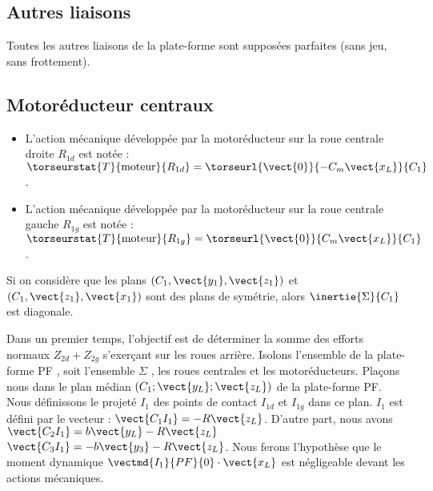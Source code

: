 \subsection*{Autres liaisons}
Toutes les autres liaisons de la plate-forme sont supposées parfaites (sans jeu, sans frottement).

\subsection*{Motoréducteur centraux}
\begin{itemize}
\item L'action mécanique développée par la motoréducteur sur la roue centrale droite $R_{1d}$ est notée : 
$\torseurstat{T}{\text{moteur}}{R_{1d}} = \torseurl{\vect{0}}{-C_m\vect{x_L}}{C_1}$.
\item L'action mécanique développée par la motoréducteur sur la roue centrale gauche $R_{1g}$ est notée : 
$\torseurstat{T}{\text{moteur}}{R_{1g}} = \torseurl{\vect{0}}{C_m\vect{x_L}}{C_1}$.
\end{itemize}

\ifprof
\begin{corrige}
Si on considère que les plans  $\left(C_1,\vect{y_1},\vect{z_1}\right)$ et 
$\left(C_1,\vect{z_1},\vect{x_1}\right)$ sont des plans de symétrie, alors $\inertie{\Sigma}{C_1}$ est diagonale.
\end{corrige}
\else
\fi


Dans un premier temps, l’objectif est de déterminer la somme des efforts normaux $Z_{2d}+Z_{2g}$ s’exerçant sur les roues
arrière. Isolons l’ensemble de la plate-forme PF , soit l’ensemble $\Sigma$ , les roues centrales et les motoréducteurs.
Plaçons nous dans le plan médian $\left(C_1;\vect{y_L};\vect{z_L}\right)$ de la plate-forme PF. Nous définissons le projeté $I_1$ des points de contact $I_{1d}$ et $I_{1g}$ dans ce plan. $I_1$ est défini par le vecteur : $\vect{C_1I_1}=-R\vect{z_L}$. 
D’autre part, nous avons 
$\vect{C_2I_1} = b\vect{y_L}-R\vect{z_L}$
$\vect{C_3I_1} = -b\vect{y_3}-R\vect{z_L}$.
Nous ferons l’hypothèse que le moment dynamique $\vectmd{I_1}{PF}{0}\cdot \vect{x_L}$
est négligeable devant les actions mécaniques.

